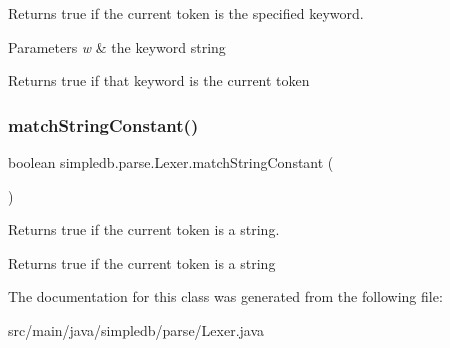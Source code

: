 Returns true if the current token is the specified keyword. 
\begin{DoxyParams}{Parameters}
{\em w} & the keyword string \\
\hline
\end{DoxyParams}
\begin{DoxyReturn}{Returns}
true if that keyword is the current token 
\end{DoxyReturn}
\mbox{\label{classsimpledb_1_1parse_1_1Lexer_aca5f9432fda019a69fe5a52dbfab0236}} 
\subsubsection{\texorpdfstring{match\+String\+Constant()}{matchStringConstant()}}
{\footnotesize\ttfamily boolean simpledb.\+parse.\+Lexer.\+match\+String\+Constant (\begin{DoxyParamCaption}{ }\end{DoxyParamCaption})\hspace{0.3cm}{\ttfamily [inline]}}

Returns true if the current token is a string. \begin{DoxyReturn}{Returns}
true if the current token is a string 
\end{DoxyReturn}


The documentation for this class was generated from the following file\+:\begin{DoxyCompactItemize}
\item 
src/main/java/simpledb/parse/Lexer.\+java\end{DoxyCompactItemize}
